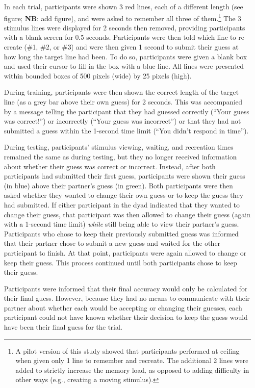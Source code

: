 \documentclass[10pt, letterpaper]{article}
\begin{document}
In each trial, participants were shown 3 red lines, each of a different
length (see figure; \textbf{NB}: add figure), and were asked to remember
all three of
them.\footnote{A pilot version of this study showed that participants performed at ceiling when given only 1 line to remember and recreate. The additional 2 lines were added to strictly increase the memory load, as opposed to adding difficulty in other ways (e.g., creating a moving stimulus).}
The 3 stimulus lines were displayed for 2 seconds then removed,
providing participants with a blank screen for 0.5 seconds. Participants
were then told which line to re-create (\#1, \#2, or \#3) and were then
given 1 second to submit their guess at how long the target line had
been. To do so, participants were given a blank box and used their
cursor to fill in the box with a blue line. All lines were presented
within bounded boxes of 500 pixels (wide) by 25 pixels (high).

During training, participants were then shown the correct length of the
target line (as a grey bar above their own guess) for 2 seconds. This
was accompanied by a message telling the participant that they had
guessed correctly (``Your guess was correct!'') or incorrectly (``Your
guess was incorrect'') or that they had not submitted a guess within the
1-second time limit (``You didn't respond in time'').

During testing, participants' stimulus viewing, waiting, and recreation
times remained the same as during testing, but they no longer received
information about whether their guess was correct or incorrect. Instead,
after both participants had submitted their first guess, participants
were shown their guess (in blue) above their partner's guess (in green).
Both participants were then asked whether they wanted to change their
own guess or to keep the guess they had submitted. If either participant
in the dyad indicated that they wanted to change their guess, that
participant was then allowed to change their guess (again with a
1-second time limit) \emph{while} still being able to view their
partner's guess. Participants who chose to keep their previously
submitted guess was informed that their partner chose to submit a new
guess and waited for the other participant to finish. At that point,
participants were again allowed to change or keep their guess. This
process continued until both participants chose to keep their guess.

Participants were informed that their final accuracy would only be
calculated for their final guess. However, because they had no means to
communicate with their partner about whether each would be accepting or
changing their guesses, each participant could not have known whether
their decision to keep the guess would have been their final guess for
the trial.
\end{document}
